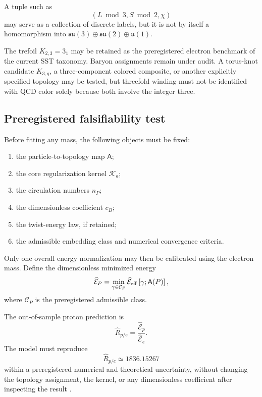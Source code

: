 A tuple such as
\begin{equation}
(L\bmod3,S\bmod2,\chi)
\end{equation}
may serve as a collection of discrete labels, but it is not by itself a
homomorphism into
\(\mathfrak{su}(3)\oplus\mathfrak{su}(2)\oplus\mathfrak{u}(1)\).

The trefoil \(K_{2,3}=3_1\) may be retained as the preregistered electron
benchmark of the current SST taxonomy.  Baryon assignments remain under
audit.  A torus-knot candidate \(K_{3,q}\), a three-component colored
composite, or another explicitly specified topology may be tested, but
threefold winding must not be identified with QCD color solely because
both involve the integer three.

\subsection{Preregistered falsifiability test}

Before fitting any mass, the following objects must be fixed:

\begin{enumerate}
\item the particle-to-topology map \(\mathsf{A}\);
\item the core regularization kernel \(\mathcal{K}_{a}\);
\item the circulation numbers \(n_P\);
\item the dimensionless coefficient \(c_B\);
\item the twist-energy law, if retained;
\item the admissible embedding class and numerical convergence criteria.
\end{enumerate}

Only one overall energy normalization may then be calibrated using the
electron mass.  Define the dimensionless minimized energy
\begin{equation}
\widehat{\mathcal{E}}_P
=
\min_{\gamma\in\mathcal{C}_P}
\widehat{\mathcal{E}}_{\rm eff}
\left[
\gamma;
\mathsf{A}(P)
\right],
\label{eq:RT-dimensionless-minimum}
\end{equation}
where \(\mathcal{C}_P\) is the preregistered admissible class.

The out-of-sample proton prediction is
\begin{equation}
\widehat{R}_{p/e}
=
\frac{
\widehat{\mathcal{E}}_p
}{
\widehat{\mathcal{E}}_e
}.
\label{eq:RT-predicted-proton-ratio}
\end{equation}
The model must reproduce
\begin{equation}
\widehat{R}_{p/e}
\simeq
1836.15267
\label{eq:RT-proton-target}
\end{equation}
within a preregistered numerical and theoretical uncertainty, without
changing the topology assignment, the kernel, or any dimensionless
coefficient after inspecting the result \cite{Mohr2025CODATA}.

